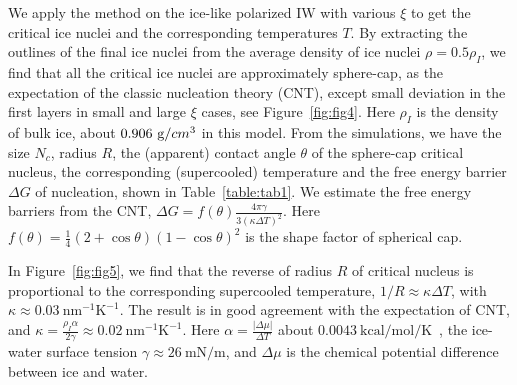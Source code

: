 \documentclass[aps,prl,twocolumn,superscriptaddress]{revtex4-1}
\begin{document}
We apply the method on the ice-like polarized IW with various $\xi$ to get the critical ice nuclei and the corresponding temperatures $T$. By extracting the outlines of the final ice nuclei from the average density of ice nuclei $\rho = 0.5 \rho_{I}$, we find that all the critical ice nuclei are approximately sphere-cap, as the expectation of the classic nucleation theory (CNT), except small deviation in the first layers in small and large $\xi$ cases, see Figure~\ref{fig:fig4}. Here $\rho_{I}$ is the density of bulk ice, about $0.906~ {\textrm g/cm^3}$ in this model. From the simulations, we have the size $N_c$, radius $R$, the (apparent) contact angle $\theta$ of the sphere-cap critical nucleus, the corresponding (supercooled) temperature and the free energy barrier $\Delta G$ of nucleation, shown in Table~\ref{table:tab1}. 
We estimate the free energy barriers from the CNT, $\Delta G = f(\theta) \frac{4 \pi \gamma}{3 (\kappa \Delta T)^{2}}$. Here $f(\theta)=\frac{1}{4}(2+\cos\theta)(1-\cos\theta)^2$ is the shape factor of spherical cap. 


In Figure~\ref{fig:fig5}, we find that the reverse of radius $R$ of critical nucleus is proportional to the corresponding  supercooled temperature, $1/R \approx \kappa \Delta T$, with 
$\kappa \approx 0.03~ \mathrm{nm^{-1} K^{-1}}$. The result is in good agreement with the expectation of CNT, and $\kappa = \frac{\rho_{I} \alpha}{2 \gamma} \approx 0.02~ \mathrm{nm^{-1} K^{-1}}$. Here 
$\alpha = \frac{|\Delta \mu|}{\Delta T}$ about $0.0043~\mathrm {kcal/mol/K}$~\cite{Sanz2013}, the ice-water surface tension $\gamma \approx 26~\mathrm{mN/m}$, and $\Delta \mu$ is the chemical potential difference between ice and water. 
 
\end{document}
